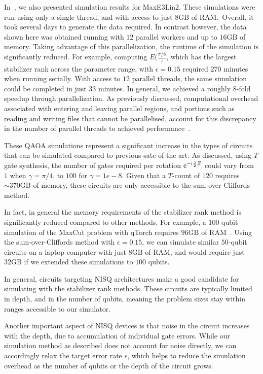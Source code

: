 In~\cite{Bravyi2018}, we also presented simulation results for MaxE3Lin2. These simulations were run using only a single thread, and with access to just $8\mathrm{GB}$ of RAM.\ Overall, it took several days to generate the data required. In contrast however, the data shown here was obtained running with $12$ parallel workers and up to $16\mathrm{GB}$ of memory. Taking advantage of this parallelization, the runtime of the simulation is significantly reduced. For example, computing $E(\frac{\pi/8})$, which has the largest stabilizer rank across the parameter range, with $\epsilon=0.15$ required $270$ minutes when running serially. With access to $12$ parallel threads, the same simulation could be completed in just $33$ minutes. In general, we achieved a roughly $8$-fold speedup through parallelization. As previously discussed, computational overhead associated with entering and leaving parallel regions, and portions such as reading and writing files that cannot be parallelised, account for this discrepancy in the number of parallel threads to achieved performance~\cite{Amdahl1967}.\par
These QAOA simulations represent a significant increase in the types of circuits that can be simulated compared to previous sate of the art. As discussed, using $T$ gate synthesis, the number of gates required per rotation $\mathrm{e}^{-\mathrm{i}\frac{\gamma}{2}Z}$ could vary from $1$ when $\gamma=\pi/4$, to $100$ for $\gamma=1e-8$. Given that a $T$-count of $120$ requires $\sim 370\mathrm{GB}$ of memory, these circuits are only accessible to the sum-over-Cliffords method.\par
In fact, in general the memory requirements of the stabilizer rank method is significantly reduced compared to other methods. For example, a $100$ qubit simulation of the MaxCut problem with qTorch requires $96\mathrm{GB}$ of RAM~\cite{SchuylerFried2017}. Using the sum-over-Cliffords method with $\epsilon=0.15$, we can simulate similar $50$-qubit circuits on a laptop computer with just $8\mathrm{GB}$ of RAM, and would require just $32\mathrm{GB}$ if we extended these simulations to $100$ qubits.\par
In general, circuits targeting NISQ architectures make a good candidate for simulating with the stabilizer rank methods. These circuits are typically limited in depth, and in the number of qubits, meaning the problem sizes stay within ranges accessible to our simulator.\par
Another important aspect of NISQ devices is that noise in the circuit increases with the depth, due to accumulation of individual gate errors. While our simulation method as described does not account for noise directly, we can accordingly relax the target error rate $\epsilon$, which helps to reduce the simulation overhead as the number of qubits or the depth of the circuit grows.\par
